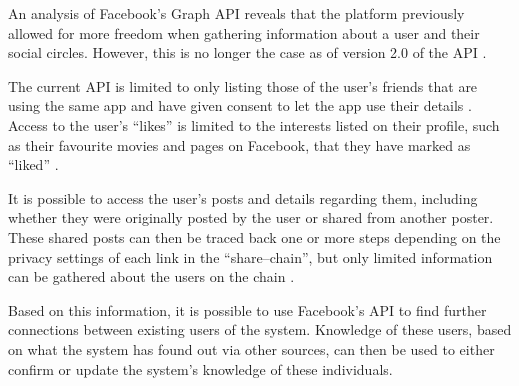 An analysis of Facebook's Graph \ac{API} \citep{FacebookGraphApiDocumentation}
reveals that the platform previously allowed for more freedom when gathering
information about a user and their social circles. However, this is no longer
the case as of version 2.0 of the \ac{API}
\citep{FacebookChangesInGraphTwoPointOh}.

The current \ac{API} is limited to only listing those of the user's friends
that are using the same app and have given consent to let the app use their
details \citep{FacebookChangesInGraphTwoPointOh}. Access to the user's ``likes''
is limited to the interests listed on their profile, such as their favourite
movies and pages on Facebook, that they have marked as ``liked''
\citep{FacebookGraphApiUserEdges} \citep{FacebookGraphApiUserLikes}
.\nl

It is possible to access the user's posts and details regarding them,
including whether they were originally posted by the user or shared from
another poster. These shared posts can then be traced back one or more steps
depending on the privacy settings of each link in the ``share--chain'', but
only limited information can be gathered about the users on the chain
\citep{FacebookGraphApiUserFeed}.\nl

Based on this information, it is possible to use Facebook's \ac{API} to find
further connections between existing users of the system.
Knowledge of these users, based on what the system has found out via other
sources, can then be used to either confirm or update the system's knowledge of
these individuals.